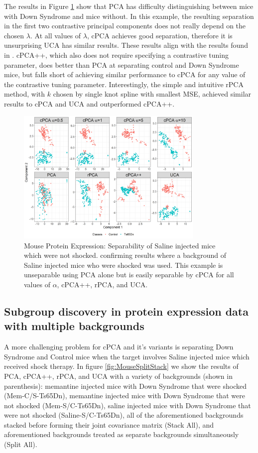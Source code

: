 \documentclass[12pt]{article}
\begin{document}
The results in Figure \ref{fig:Mouse} show that PCA has difficulty distinguishing between mice with Down Syndrome and mice without.  In this example, the resulting separation in the first two contrastive principal components does not really depend on the chosen $\lambda$. At all values of $\lambda$, cPCA achieves good separation, therefore it is unsurprising UCA has similar results. These results align with the results found in  \cite{Abid}. cPCA++, which also does not require specifying a contrastive tuning parameter, does better than PCA at separating control and Down Syndrome mice, but falls short of achieving similar performance to cPCA for any value of the contrastive tuning parameter. Interestingly, the simple and intuitive rPCA method, with $k$ chosen by single knot spline with smallest MSE, achieved similar results to cPCA and UCA and outperformed cPCA++.

\begin{figure}[t]
    \centering
	\includegraphics[width = 0.8\textwidth]{figure/Mouse_Data.png}
	\caption{Mouse Protein Expression: Separability of Saline injected mice which were not shocked. confirming  \cite{Abid} results where a background of Saline injected mice who were shocked was used. This example is unseparable using PCA alone but is easily separable by cPCA for all values of $\alpha$, cPCA++, rPCA, and UCA.}
	\label{fig:Mouse}
\end{figure}

\subsection{Subgroup discovery in protein expression data with multiple backgrounds}
A more challenging problem for cPCA and it's variants is separating Down Syndrome and Control mice when the target involves Saline injected mice which received shock therapy. In figure \ref{fig:MouseSplitStack} we show the results of PCA, cPCA++, rPCA, and UCA with a variety of backgrounds (shown in parenthesis): memantine injected mice with Down Syndrome that were shocked (Mem-C/S-Ts65Dn), memantine injected mice with Down Syndrome that were not shocked (Mem-S/C-Ts65Dn), saline injected mice with Down Syndrome that were not shocked (Saline-S/C-Ts65Dn), all of the aforementioned backgrounds stacked before forming their joint covariance matrix (Stack All), and aforementioned backgrounds treated as separate backgrounds simultaneously (Split All). 
\end{document}
